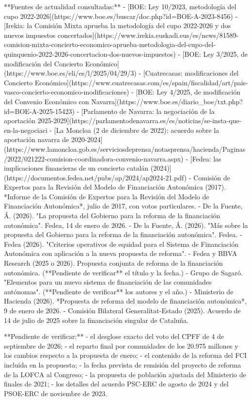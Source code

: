 \documentclass[10pt,a4paper]{article}
\begin{document}
{**Fuentes de actualidad consultadas:**
- [BOE: Ley 10/2023, metodología del cupo 2022-2026](https://www.boe.es/buscar/doc.php?id=BOE-A-2023-8456)
- [Irekia: la Comisión Mixta aprueba la metodología del cupo 2022-2026 y dos nuevos impuestos concertados](https://www.irekia.euskadi.eus/es/news/81589-comision-mixta-concierto-economico-aprueba-metodologia-del-cupo-del-quinquenio-2022-2026-concertacion-dos-nuevos-impuestos)
- [BOE: Ley 3/2025, de modificación del Concierto Económico](https://www.boe.es/eli/es/l/2025/04/29/3)
- [Cuatrecasas: modificaciones del Concierto Económico](https://www.cuatrecasas.com/es/spain/fiscalidad/art/pais-vasco-concierto-economico-modificaciones)
- [BOE: Ley 4/2025, de modificación del Convenio Económico con Navarra](https://www.boe.es/diario_boe/txt.php?id=BOE-A-2025-15423)
- [Parlamento de Navarra: la negociación de la aportación 2025-2029](https://parlamentodenavarra.es/es/noticias/se-insta-que-en-la-negociaci%
- [La Moncloa (2 de diciembre de 2022): acuerdo sobre la aportación navarra de 2020-2024](https://www.lamoncloa.gob.es/serviciosdeprensa/notasprensa/hacienda/Paginas/2022/021222-comision-coordinadora-convenio-navarra.aspx)
- [Fedea: las implicaciones financieras de un concierto catalán (2024)](https://documentos.fedea.net/pubs/ap/2024/ap2024-21.pdf)
- Comisión de Expertos para la Revisión del Modelo de Financiación Autonómica (2017). *Informe de la Comisión de Expertos para la Revisión del Modelo de Financiación Autonómica*, julio de 2017, con votos particulares.
- De la Fuente, Á. (2026). "La propuesta del Gobierno para la reforma de la financiación autonómica". Fedea, 14 de enero de 2026.
- De la Fuente, Á. (2026). "Más sobre la propuesta del Gobierno para la reforma de la financiación autonómica". Fedea.
- Fedea (2026). "Criterios operativos de equidad para el Sistema de Financiación Autonómica con aplicación a la nueva propuesta de reforma".
- Fedea y BBVA Research (2025 o 2026). Propuesta conjunta de reforma de la financiación autonómica. (**Pendiente de verificar** el título y la fecha.)
- Grupo de Sagaró. "Elementos para un nuevo sistema de financiación de las comunidades autónomas". (**Pendiente de verificar** los autores y el año.)
- Ministerio de Hacienda (2026). *Propuesta de reforma del modelo de financiación autonómica*, 9 de enero de 2026.
- Comisión Bilateral Generalitat-Estado (2025). Acuerdo de 14 de julio de 2025 sobre la financiación singular de Cataluña.

**Pendiente de verificar:**
- el desglose exacto del voto del CPFF de 4 de septiembre de 2026;
- el reparto final por comunidades de los 20.975 millones y los cambios respecto a la propuesta de enero;
- el contenido de la reforma del FCI incluida en la propuesta;
- la fecha prevista de remisión del proyecto de reforma de la LOFCA al Congreso;
- la propuesta de población ajustada del Ministerio de finales de 2021;
- los detalles del acuerdo PSC-ERC de agosto de 2024 y del PSOE-ERC de noviembre de 2023.

}
\end{document}
